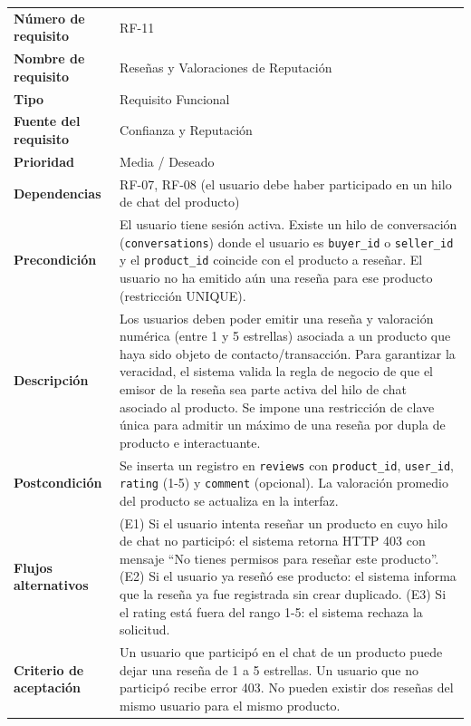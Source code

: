 \documentclass[11pt,a4paper]{report}
\begin{document}
\begin{table}[H]
\centering
\begin{tabularx}{\textwidth}{|l|L|}
\hline
{} \\ \hline
\textbf{Número de requisito} & RF-11 \\ \hline
\textbf{Nombre de requisito} & Reseñas y Valoraciones de Reputación \\ \hline
\textbf{Tipo} & Requisito Funcional \\ \hline
\textbf{Fuente del requisito} & Confianza y Reputación \\ \hline
\textbf{Prioridad} & Media / Deseado \\ \hline
\textbf{Dependencias} & RF-07, RF-08 (el usuario debe haber participado en un hilo de chat del producto) \\ \hline
\textbf{Precondición} & El usuario tiene sesión activa. Existe un hilo de conversación (\texttt{conversations}) donde el usuario es \texttt{buyer\_id} o \texttt{seller\_id} y el \texttt{product\_id} coincide con el producto a reseñar. El usuario no ha emitido aún una reseña para ese producto (restricción UNIQUE). \\ \hline
\textbf{Descripción} & Los usuarios deben poder emitir una reseña y valoración numérica (entre 1 y 5 estrellas) asociada a un producto que haya sido objeto de contacto/transacción. Para garantizar la veracidad, el sistema valida la regla de negocio de que el emisor de la reseña sea parte activa del hilo de chat asociado al producto. Se impone una restricción de clave única para admitir un máximo de una reseña por dupla de producto e interactuante. \\ \hline
\textbf{Postcondición} & Se inserta un registro en \texttt{reviews} con \texttt{product\_id}, \texttt{user\_id}, \texttt{rating} (1-5) y \texttt{comment} (opcional). La valoración promedio del producto se actualiza en la interfaz. \\ \hline
\textbf{Flujos alternativos} & (E1) Si el usuario intenta reseñar un producto en cuyo hilo de chat no participó: el sistema retorna HTTP 403 con mensaje ``No tienes permisos para reseñar este producto''. (E2) Si el usuario ya reseñó ese producto: el sistema informa que la reseña ya fue registrada sin crear duplicado. (E3) Si el rating está fuera del rango 1-5: el sistema rechaza la solicitud. \\ \hline
\textbf{Criterio de aceptación} & Un usuario que participó en el chat de un producto puede dejar una reseña de 1 a 5 estrellas. Un usuario que no participó recibe error 403. No pueden existir dos reseñas del mismo usuario para el mismo producto. \\ \hline
\end{tabularx}
\end{table}
\end{document}
